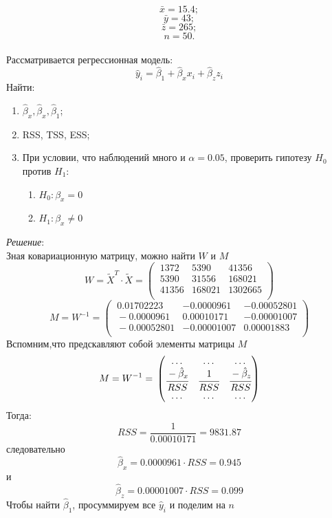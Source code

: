 \documentclass[12pt]{article} %
\theoremstyle{definition} %
\def \hb{\hat{\beta}}
\begin{document}
\[\bar{x} = 15.4;\]
\[\bar{y} = 43;\]
\[\bar{z} = 265;\]
\[n = 50.\]\\
Рассматривается регрессионная модель:\\
\[\hat{y}_i=\hat{\beta}_1+\hat{\beta}_xx_i+\hat{\beta}_zz_i\]
Найти:\\
\begin{enumerate}
    \item $\hat{\beta}_x, \hat{\beta}_x, \hat{\beta}_1$;
    \item RSS, TSS, ESS;
    \item При условии, что наблюдений много и $\alpha = 0.05$, проверить гипотезу $H_0$ против $H_1$:  
    \begin{enumerate}
        \item $H_0: \beta_x = 0$
        \item $H_1: \beta_x \neq 0$
    \end{enumerate}
\end{enumerate}
\textit{Решение}:\\
Зная ковариационную матрицу, можно найти $W$ и $M$
\[W = \widetilde{X}^T\cdot\widetilde{X} = \begin{pmatrix}
            \ 1372 & 5390 & 41356\\
            \ 5390 & 31556 & 168021 \\ 
            \ 41356 & 168021 & 1302665\\
        \end{pmatrix}
\]
\[M = W^{-1} = \begin{pmatrix}
            \ 0.01702223 & -0.0000961 & -0.00052801\\
            \ -0.0000961 &  0.00010171 & -0.00001007 \\
            \ -0.00052801 & -0.00001007 &  0.00001883\\
        \end{pmatrix}
\]
Вспомним,что предскавляют собой элементы матрицы $M$
 \[ 
 M = W^{-1} = \\
    \begin{pmatrix}
         \ldots & \ldots & \ldots \\
        \cfrac{-\hb_x}{RSS} & \cfrac{1}{RSS} & \cfrac{-\hb_z}{RSS}  \\
        \ldots & \ldots & \ldots \\
     \end{pmatrix}
 \]
Тогда: 
\[RSS = \dfrac{1}{0.00010171} =  9831.87\]    
следовательно
\[\hb_x = 0.0000961\cdot RSS = 0.945\]
и
\[\hb_z = 0.00001007\cdot RSS = 0.099\]
Чтобы найти $\hat{\beta}_1$, просуммируем все $\hat{y}_i$ и поделим на $n$
\end{document}

